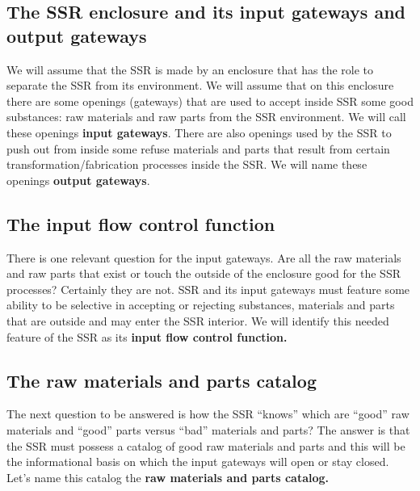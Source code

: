 \subsection[The SSR enclosure and its input gateways and output
gateways]{The SSR enclosure and its input gateways and output gateways}
\hypertarget{RefHeading3050306210128}{}We will assume that the SSR is
made by an enclosure that has the role to separate the SSR from its
environment. We will assume that on this enclosure there are some
openings (gateways) that are used to accept inside SSR some good
substances: raw materials and raw parts from the SSR environment. We
will call these openings \textbf{input gateways}. There are also
openings used by the SSR to push out from inside some refuse materials
and parts that result from certain transformation/fabrication processes
inside the SSR. We will name these openings \textbf{output gateways}.


\bigskip

\subsection[The input flow control function]{The input flow control
function}
\hypertarget{RefHeading3052306210128}{}There is one relevant question
for the input gateways. Are all the raw materials and raw parts that
exist or touch the outside of the enclosure good for the SSR processes?
Certainly they are not. SSR and its input gateways must feature some
ability to be selective in accepting or rejecting substances, materials
and parts that are outside and may enter the SSR interior. We will
identify this needed feature of the SSR as its \textbf{input flow
control function.}


\bigskip

\subsection[The raw materials and parts catalog]{The raw materials and
parts catalog}
\hypertarget{RefHeading3054306210128}{}The next question to be answered
is how the SSR “knows” which are “good” raw materials and “good” parts
versus “bad” materials and parts? The answer is that the SSR must
possess a catalog of good raw materials and parts and this will be the
informational basis on which the input gateways will open or stay
closed. Let’s name this catalog the \textbf{raw materials and parts
catalog.}


\bigskip

